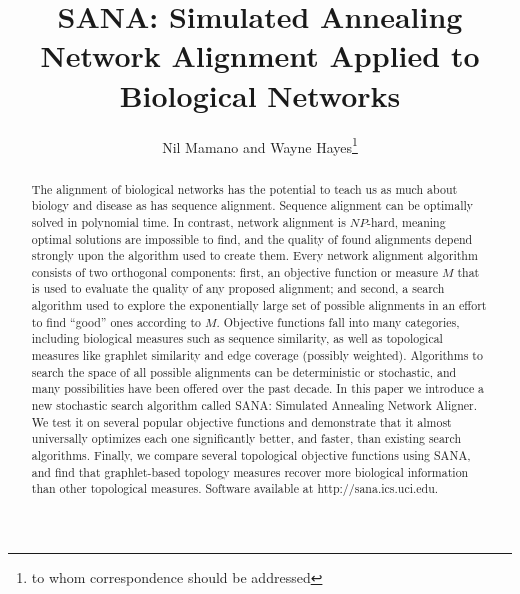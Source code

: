 \documentclass{bioinfo}
\begin{document}

\title[SANA: Simulated Annealing Network Alignment Applied to Biological Networks]{SANA: Simulated Annealing Network Alignment Applied to Biological Networks}
\author[N.Mamano and W.Hayes]{Nil Mamano and Wayne Hayes\footnote{to whom correspondence should be addressed}}
\address{Department of Computer Science, University of California, Irvine CA 92697-3435, USA
}



\maketitle

\begin{abstract}
The alignment of biological networks has the potential to teach us as much about biology and disease as has sequence alignment.
Sequence alignment can be optimally solved in polynomial time. In contrast, network alignment is $NP$-hard,
meaning optimal solutions are impossible to find, and the quality of found alignments depend strongly upon the algorithm used
to create them.
Every network alignment algorithm consists of two orthogonal components: first, an objective function or measure $M$ that is used to evaluate the quality of any proposed alignment; and second, a search algorithm used to explore the exponentially large set of possible alignments in an effort to find ``good'' ones according to $M$.  Objective functions fall into many categories, including biological measures such as sequence similarity, as well as topological measures like graphlet similarity and edge coverage (possibly weighted). Algorithms to search the space of all possible alignments can be deterministic or stochastic, and many possibilities have been offered over the past decade. In this paper we introduce a new stochastic search algorithm called SANA: Simulated Annealing Network Aligner. We test it on several popular objective functions and demonstrate that it almost universally optimizes each one significantly better, and faster, than existing search algorithms.
Finally, we compare several topological objective functions using SANA, and find that graphlet-based topology measures recover more biological information than other topological measures.
Software available at http://sana.ics.uci.edu.

\end{abstract}
\end{document}
